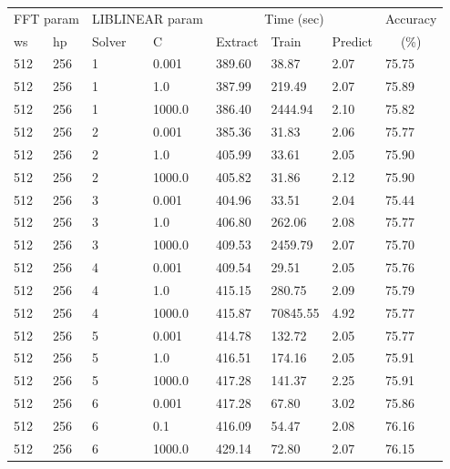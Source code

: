 \documentclass[12pt,oneside]{book}
\begin{document}
\begin{table}
\begin{tabular}{|l|l|l|l|l|l|l|l|}
\hline
\multicolumn{2}{|c}{FFT param} & \multicolumn{2}{|c}{LIBLINEAR param} & \multicolumn{3}{|c|}{Time (sec)} &  Accuracy \\
\hhline{|-|-|-|-|-|-|-|~|}
ws & hp & Solver & C & Extract & Train & Predict & \multicolumn{1}{c|}{(\%)} \\
\hhline{|=|=|=|=|=|=|=|=|}
 512 & 256     &   1 & 0.001   &  389.60  &     38.87  &  2.07  &  75.75  \\
 512 & 256     &   1 & 1.0     &  387.99  &    219.49  &  2.07  &  75.89  \\
 512 & 256     &   1 & 1000.0  &  386.40  &   2444.94  &  2.10  &  75.82  \\
\hline
 512 & 256     &   2 & 0.001   &  385.36  &     31.83  &  2.06  &  75.77  \\
 512 & 256     &   2 & 1.0     &  405.99  &     33.61  &  2.05  &  75.90  \\
 512 & 256     &   2 & 1000.0  &  405.82  &     31.86  &  2.12  &  75.90  \\
\hline
 512 & 256     &   3 & 0.001   &  404.96  &     33.51  &  2.04  &  75.44  \\
 512 & 256     &   3 & 1.0     &  406.80  &    262.06  &  2.08  &  75.77  \\
 512 & 256     &   3 & 1000.0  &  409.53  &   2459.79  &  2.07  &  75.70  \\
\hline
 512 & 256     &   4 & 0.001   &  409.54  &     29.51  &  2.05  &  75.76  \\
 512 & 256     &   4 & 1.0     &  415.15  &    280.75  &  2.09  &  75.79  \\
 512 & 256     &   4 & 1000.0  &  415.87  &  70845.55  &  4.92  &  75.77  \\
\hline
 512 & 256     &   5 & 0.001   &  414.78  &    132.72  &  2.05  &  75.77  \\
 512 & 256     &   5 & 1.0     &  416.51  &    174.16  &  2.05  &  75.91  \\
 512 & 256     &   5 & 1000.0  &  417.28  &    141.37  &  2.25  &  75.91  \\
\hline
 512 & 256     &   6 & 0.001   &  417.28  &     67.80  &  3.02  &  75.86  \\
 512 & 256     &   6 & 0.1     &  416.09  &     54.47  &  2.08  &  76.16  \\
 512 & 256     &   6 & 1000.0  &  429.14  &     72.80  &  2.07  &  76.15  \\

\end{tabular}
\end{table}
\end{document}
